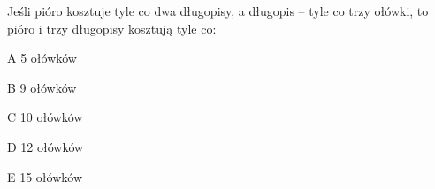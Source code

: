 \begin{tresc}
Jeśli pióro kosztuje tyle co dwa długopisy, a długopis – tyle co trzy ołówki, to pióro i trzy długopisy kosztują tyle co:
\end{tresc}
\begin{wariant}{A} 5 ołówków \end{wariant}
\begin{wariant}{B} 9 ołówków \end{wariant}
\begin{wariant}{C} 10 ołówków \end{wariant}
\begin{wariant}{D} 12 ołówków \end{wariant}
\begin{wariant}{E} 15 ołówków \end{wariant}
